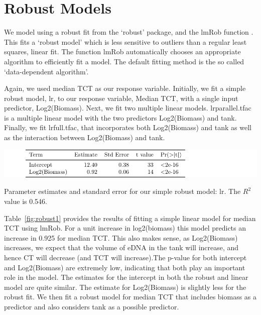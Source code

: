 \section{Robust Models}

We model using a robust fit from the `robust' package, and the lmRob function \citep{RobustModels}. This fits a `robust model' which is less sensitive to outliers than a regular least squares, linear fit. The function lmRob automatically chooses an appropriate algorithm to efficiently fit a model.  The default fitting method is the so called `data-dependent algorithm'.

 \vspace{12pt}

 Again, we used median TCT as our response variable. Initially, we fit a simple robust model, lr, to our response variable, Median TCT, with  a single input predictor, Log2(Biomass). Next, we fit two multiple linear models. lrparallel.tfac is a multiple linear model with the two predictors Log2(Biomass) and tank. Finally, we fit  lrfull.tfac, that incorporates both Log2(Biomass) and tank as well as the interaction between Log2(Biomass) and tank. 

 \vspace{12pt}

%


\begin{table}[H]
\includegraphics{Chapter3Images/robust1.pdf}
\caption{Parameter estimates and standard error for our simple robust model: lr. The $R^{2}$ value is 0.546.}
\label{fig:robust1}
\end{table}

 Table~\ref{fig:robust1} provides the results of fitting a simple linear model for median TCT using lmRob. For a unit increase in log2(biomass) this model predicts an increase in 0.925 for median TCT. This also makes sense, as Log2(Biomass) increases, we expect that the volume of eDNA in the tank will increase, and hence CT will decrease (and TCT will increase).The p-value for both intercept and Log2(Biomass) are extremely low, indicating that both  play an important role in the model. The estimates for the intercept in both the robust and linear model are quite similar.  The estimate for Log2(Biomass) is slightly less for the robust fit. We then fit a robust model for median TCT that includes biomass as a predictor and also considers tank as a possible predictor.

